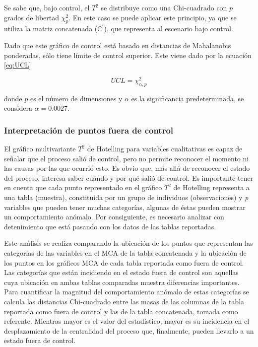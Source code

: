 \documentclass[mathematics,article,submit,moreauthors,pdftex]{mdpi}
\begin{document}
Se sabe que, bajo control, el \(T^2\) se distribuye como una
Chi-cuadrado con \(p\) grados de libertad \(\chi^2_p\). En este caso se
puede aplicar este principio, ya que se utiliza la matriz concatenada
(\(\mathbb{C}^{'}\)), que representa al escenario bajo control.

Dado que este gráfico de control está basado en distancias de
Mahalanobis ponderadas, sólo tiene límite de control superior. Este
viene dado por la ecuación \ref{eq:UCL}

\begin{equation}
UCL=\chi^2_{\alpha,p}
\label{eq:UCL}
\end{equation}

donde \(p\) es el número de dimensiones y \(\alpha\) es la significancia
predeterminada, se considera \(\alpha=0.0027\).

\hypertarget{interpretaciuxf3n-de-puntos-fuera-de-control}{%
\subsubsection{Interpretación de puntos fuera de
control}\label{interpretaciuxf3n-de-puntos-fuera-de-control}}

El gráfico multivariante \(T^2\) de Hotelling para variables
cualitativas es capaz de señalar que el proceso salió de control, pero
no permite reconocer el momento ni las causas por las que ocurrió esto.
Es obvio que, más allá de reconocer el estado del proceso, interesa
saber cuándo y por qué salió de control. Es importante tener en cuenta
que cada punto representado en el gráfico \(T^2\) de Hotelling
representa a una tabla (muestra), constituida por un grupo de individuos
(observaciones) y \emph{p} variables que pueden tener muchas categorías,
algunas de éstas pueden mostrar un comportamiento anómalo. Por
consiguiente, es necesario analizar con detenimiento que está pasando
con los datos de las tablas reportadas.

Este análisis se realiza comparando la ubicación de los puntos que
representan las categorías de las variables en el MCA de la tabla
concatenada y la ubicación de los puntos en los gráficos MCA de cada
tabla reportada como fuera de control. Las categorías que están
incidiendo en el estado fuera de control son aquellas cuya ubicación en
ambas tablas comparadas muestra diferencias importantes. Para
cuantificar la magnitud del comportamiento anómalo de estas categorías
se calcula las distancias Chi-cuadrado entre las masas de las columnas
de la tabla reportada como fuera de control y las de la tabla
concatenada, tomada como referente. Mientras mayor es el valor del
estadístico, mayor es su incidencia en el desplazamiento de la
centralidad del proceso que, finalmente, pueden llevarlo a un estado
fuera de control.
\end{document}

